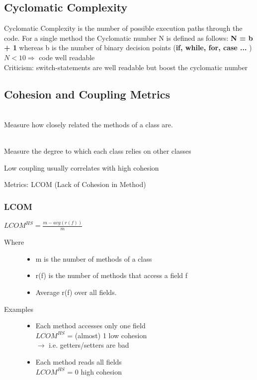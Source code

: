 \documentclass[a4paper,10pt]{article}
\newcommand{\Bold}[1]{\textbf{#1}} %
\newcommand{\ra}{\rightarrow}
\newcommand{\Ra}{\Rightarrow}
\begin{document}
\subsection{Cyclomatic Complexity}
Cyclomatic Complexity is the number of possible execution paths through the code. For a single method the Cyclomatic number N is defined as follows: \Bold {N = b + 1} whereas b is the number of binary decision points (\Bold {if, while, for, case ...} ) \\
$N < 10 \Ra $ code well readable \\
Criticism: switch-statements are well readable but boost the cyclomatic number

\subsection{Cohesion and Coupling Metrics}
\begin{description}
	\item[Cohesion] \hfill \\
		Measure how closely related the methods of a class are.
	\item[Coupling / Dependency] \hfill \\
		Measure the degree to which each class relies on other classes
	\item Low coupling usually correlates with high cohesion
	\item Metrics: LCOM (Lack of Cohesion in Method)
\end{description}

\subsubsection{LCOM}
$LCOM^{HS} = \frac{m-avg(r(f))}{m}$
\begin{description}
	\item[Where] \hfill
		\begin{itemize}
			\item m is the number of methods of a class
			\item r(f) is the number of methods that access a field f
			\item Average r(f) over all fields.
		\end{itemize}
	\item[Examples] \hfill
		\begin{itemize}
			\item Each method accesses only one field \\
				$LCOM^{HS}$ = (almost) 1 low cohesion \\
				$\ra$ i.e. getters/setters are bad
			\item Each method reads all fields \\
				$LCOM^{HS}$ = 0 high cohesion
		\end{itemize}
\end{description}
\end{document}
